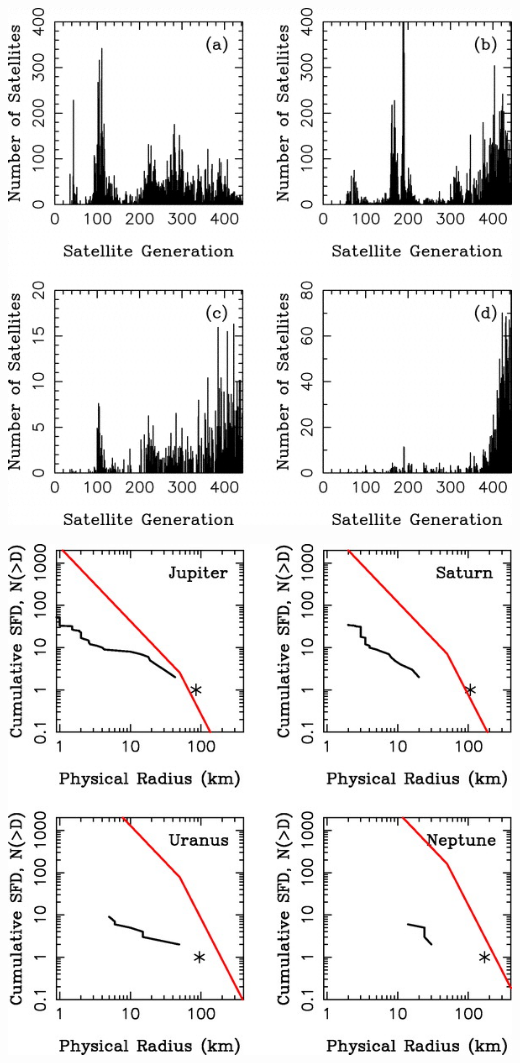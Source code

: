 \documentclass[10pt,a4paper,twoside]{article}
\renewenvironment{figure}{}{}
\begin{document}
\begin{figure}[tbn]
\includegraphics[scale=0.2]{img/Nesvorny2007-8.png}
\caption{•}
\end{figure}
\begin{figure}[tbn]
\includegraphics[scale=1]{img/Nesvorny2007-9.jpg}
\caption{•}
\end{figure}
\end{document}
